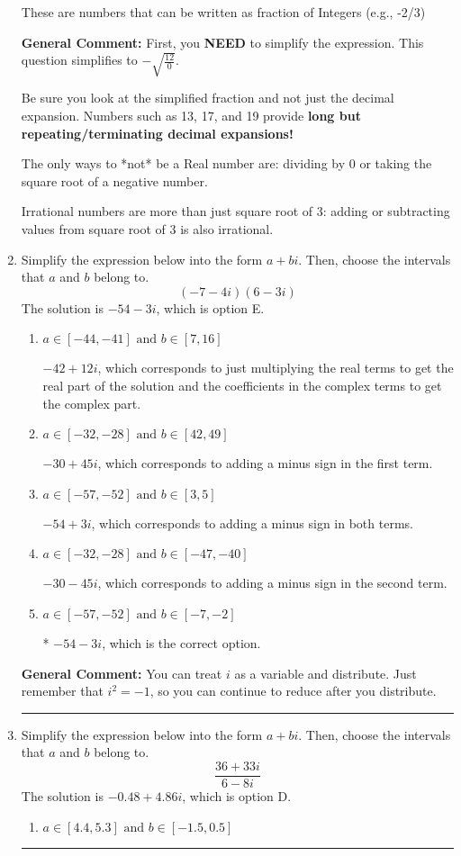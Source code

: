 \documentclass{extbook}[14pt]
\newcommand{\litem}[1]{\item #1

\rule{\textwidth}{0.4pt}}
\begin{document}
\begin{enumerate}
{\begin{enumerate}[label=\Alph*.]
These are numbers that can be written as fraction of Integers (e.g., -2/3)
\end{enumerate}

\textbf{General Comment:} First, you \textbf{NEED} to simplify the expression. This question simplifies to $-\sqrt{\frac{12}{0}}$. 
 
 Be sure you look at the simplified fraction and not just the decimal expansion. Numbers such as 13, 17, and 19 provide \textbf{long but repeating/terminating decimal expansions!} 
 
 The only ways to *not* be a Real number are: dividing by 0 or taking the square root of a negative number. 
 
 Irrational numbers are more than just square root of 3: adding or subtracting values from square root of 3 is also irrational.
}
\litem{
Simplify the expression below into the form $a+bi$. Then, choose the intervals that $a$ and $b$ belong to.
\[ (-7 - 4 i)(6 - 3 i) \]The solution is \( -54 - 3 i \), which is option E.\begin{enumerate}[label=\Alph*.]
\item \( a \in [-44, -41] \text{ and } b \in [7, 16] \)

 $-42 + 12 i$, which corresponds to just multiplying the real terms to get the real part of the solution and the coefficients in the complex terms to get the complex part.
\item \( a \in [-32, -28] \text{ and } b \in [42, 49] \)

 $-30 + 45 i$, which corresponds to adding a minus sign in the first term.
\item \( a \in [-57, -52] \text{ and } b \in [3, 5] \)

 $-54 + 3 i$, which corresponds to adding a minus sign in both terms.
\item \( a \in [-32, -28] \text{ and } b \in [-47, -40] \)

 $-30 - 45 i$, which corresponds to adding a minus sign in the second term.
\item \( a \in [-57, -52] \text{ and } b \in [-7, -2] \)

* $-54 - 3 i$, which is the correct option.
\end{enumerate}

\textbf{General Comment:} You can treat $i$ as a variable and distribute. Just remember that $i^2=-1$, so you can continue to reduce after you distribute.
}
\litem{
Simplify the expression below into the form $a+bi$. Then, choose the intervals that $a$ and $b$ belong to.
\[ \frac{36 + 33 i}{6 - 8 i} \]The solution is \( -0.48  + 4.86 i \), which is option D.\begin{enumerate}[label=\Alph*.]
\item \( a \in [4.4, 5.3] \text{ and } b \in [-1.5, 0.5] \)


\end{enumerate}}
\end{enumerate}
\end{document}
